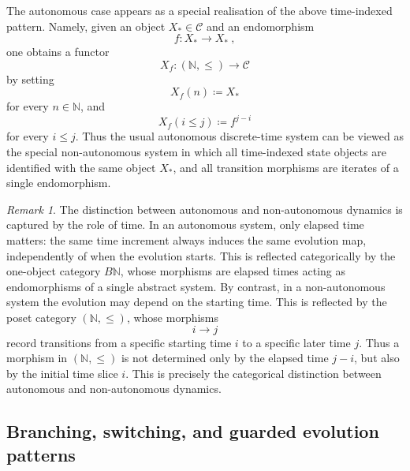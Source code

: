 \documentclass[a4paper,reqno,oneside]{amsart}
\theoremstyle{definition}
\theoremstyle{remark}
\newtheorem{remark}[theorem]{Remark}
\newcommand{\N}{\mathbb{N}}
\numberwithin{equation}{section}
\begin{document}
	
	The autonomous case appears as a special realisation of the above time-indexed
	pattern. Namely, given an object $X_*\in\mathcal C$ and an endomorphism
	\begin{equation}
		f\colon X_*\longrightarrow X_* \ ,
	\end{equation}
	one obtains a functor
	\begin{equation}
		X_f\colon(\N,\leq)\to\mathcal C
	\end{equation}
	by setting
	\begin{equation}
		X_f(n)\coloneqq X_*
	\end{equation}
	for every $n\in\N$, and
	\begin{equation}
		X_f(i\leq j)\coloneqq f^{j-i}
	\end{equation}
	for every $i\leq j$. Thus the usual autonomous discrete-time system can be
	viewed as the special non-autonomous system in which all time-indexed state
	objects are identified with the same object $X_*$, and all transition
	morphisms are iterates of a single endomorphism.
	
	
	
	
	
	\begin{remark}
		The distinction between autonomous and non-autonomous dynamics is captured
		by the role of time. In an autonomous system, only elapsed time matters: the same time increment always induces the same
		evolution map, independently of when the evolution starts. This is reflected
		categorically by the one-object category $B\N$, whose morphisms are elapsed
		times acting as endomorphisms of a single abstract system. By contrast, in a non-autonomous system the evolution may depend on the
		starting time. This is reflected by the poset category $(\N,\leq)$, whose morphisms
		\begin{equation}
			i\to j
		\end{equation}
		record transitions from a specific starting time $i$ to a specific later
		time $j$. Thus a morphism in $(\N,\leq)$ is not determined only by the
		elapsed time $j-i$, but also by the initial time slice $i$. This is precisely
		the categorical distinction between autonomous and non-autonomous dynamics.
	\end{remark}
	
	
	
	
	\subsection{Branching, switching, and guarded evolution patterns}\label{sec: switching systems}
	
\end{document}
